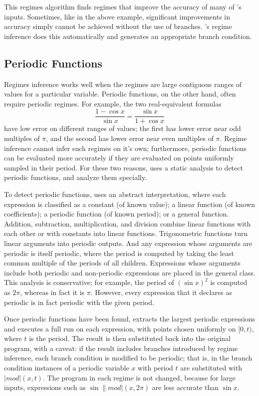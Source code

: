 \documentclass[paper.tex]{subfiles}
\begin{document}
This regimes algorithm finds regimes that improve
  the accuracy of many of \casio's inputs.
Sometimes, like in the above example,
  significant improvements in accuracy simply cannot be achieved
  without the use of branches.
\casio's regime inference does this automatically
  and generates an appropriate branch condition.

\subsection{Periodic Functions}

Regimes inference works well when the regimes
  are large contiguous ranges of values for a particular variable.
Periodic functions, on the other hand, often require periodic regimes.
For example, the two real-equivalent formulas
\[
\frac{1 - \cos x}{\sin x} = \frac{\sin x}{1 + \cos x}
\]
  have low error on different ranges of values;
  the first has lower error near odd multiples of $\pi$,
  and the second has lower error near even multiples of $\pi$.
Regime inference cannot infer such regimes on it's own; furthermore,
  periodic functions can be evaluated more accurately
  if they are evaluated on points uniformly sampled in their period.
For these two reasons, \casio uses a static analysis
  to detect periodic functions, and analyze them specially.

To detect periodic functions, \casio uses an abstract interpretation,
  where each expression is classified as
  a constant (of known value); a linear function (of known coefficients);
  a periodic function (of known period); or a general function.
Addition, subtraction, multiplication, and division
  combine linear functions with each other or with constants
  into linear functions.
Trigonometric functions turn linear arguments
  into periodic outputs.
And any expression whose arguments are periodic
  is itself periodic, where the period is computed
  by taking the least common multiple of the periods of all children.
Expressions whose arguments include
  both periodic and non-periodic expressions
  are placed in the general class.
This analysis is conservative; for example, the period of $(\sin x)^2$
  is computed as $2 \pi$, whereas in fact it is $\pi$.
However, every expression that it declares as periodic
  is in fact periodic with the given period.

Once periodic functions have been found,
  \casio extracts the largest periodic expressions
  and executes a full \casio run on each expression,
  with points chosen uniformly on $[0, t)$,
  where $t$ is the period.
The result is then substituted back into the original program,
  with a caveat:
  if the result includes branches introduced by regime inference,
  each branch condition is modified to be periodic;
  that is, in the branch condition
  instances of a periodic variable $x$ with period $t$
  are substituted with $|mod|(x, t)$.
The program in each regime is not changed,
  because for large inputs, expressions such as
  $\sin \|mod|(x, 2\pi)$
  are less accurate than $\sin x$.
\end{document}
